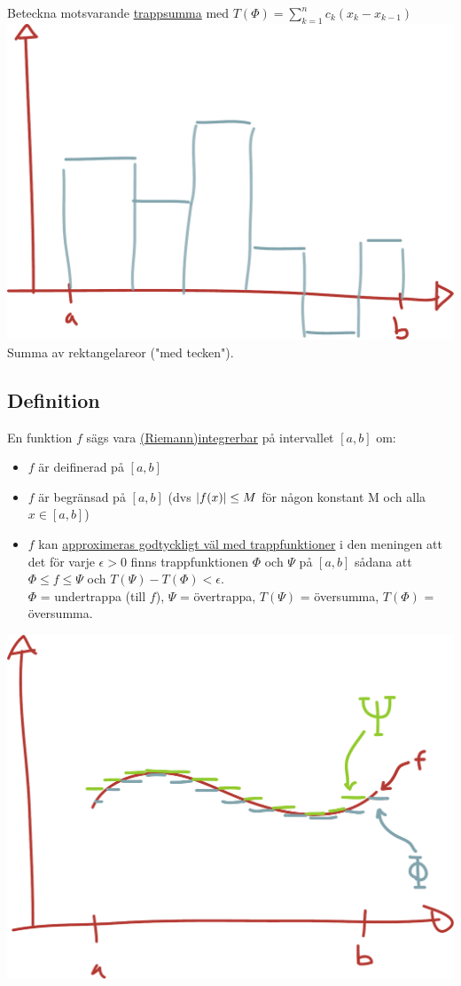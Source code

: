 \documentclass{article}
\begin{document}
Beteckna motsvarande \uline{trappsumma} med $T(\Phi)=\sum_{k=1}^n c_k (x_k-x_{k-1})$\\
\includegraphics[scale=0.25]{img/img2.pdf}\\
Summa av rektangelareor ("med tecken").

\subsection{Definition}
En funktion $f$ sägs vara \uline{(Riemann)integrerbar} på intervallet $[a,b]$ om:

\begin{itemize}
  \item $f$ är deifinerad på $[a,b]$
  \item $f$ är begränsad på $[a,b]$ (dvs $\lvert f(x)\rvert\le M$ för någon konstant M och alla $x\in [a,b]$)
  \item $f$ kan \uline{approximeras godtyckligt väl med trappfunktioner} i den meningen att det för varje $\epsilon>0$
    finns trappfunktionen $\Phi$ och $\Psi$ på $[a,b]$ sådana att $\Phi\le f \le\Psi$ och $T(\Psi)-T(\Phi) < \epsilon$.\\
    $\Phi$ = undertrappa (till $f$), $\Psi$ = övertrappa, $T(\Psi)$ = översumma, $T(\Phi)$ = översumma.
\end{itemize}
\includegraphics[scale=0.25]{img/img3.pdf}\\
\end{document}
